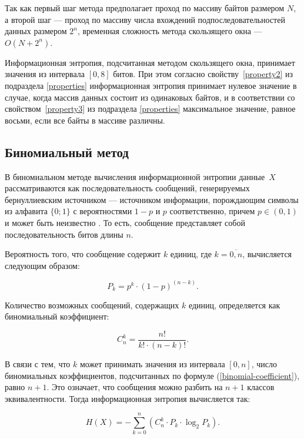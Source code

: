 Так как первый шаг метода предполагает проход по массиву байтов размером $N$, а второй шаг --- проход по массиву числа вхождений подпоследовательностей данных размером $2^n$, временная сложность метода скользящего окна --- $O(N + 2^n)$. 

Информационная энтропия, подсчитанная методом скользящего окна, принимает значения из интервала $[0, 8]$ битов. При этом согласно свойству~\ref{property2} из подраздела \ref{properties} информационная энтропия принимает нулевое значение в случае, когда массив данных состоит из одинаковых байтов, и в соответствии со свойством~\ref{property3} из подраздела \ref{properties} максимальное значение, равное восьми, если все байты в массиве различны.

\subsection{Биномиальный метод}\label{binomial}

В биномиальном методе вычисления информационной энтропии \cite{binomial-method} данные~$X$ рассматриваются как последовательность сообщений, генерируемых бернуллиевским источником --- источником информации, порождающим символы из алфавита $\{0; 1\}$ с вероятностями $1 - p$ и $p$ соответственно, причем $p \in (0, 1)$ и может быть неизвестно \cite{bernullie-source}. То есть, сообщение представляет собой последовательность битов длины $n$.

Вероятность того, что сообщение содержит $k$ единиц, где $k = \overline{0, n}$, вычисляется следующим образом:

\begin{equation}\label{pk}
	P_{k} = p^k \cdot (1 - p)^{(n - k)}.
\end{equation} 

Количество возможных сообщений, содержащих $k$ единиц, определяется как биномиальный коэффициент:

\begin{equation}\label{binomial-coefficient}
	C_{n}^k = \frac{n!}{k! \cdot (n - k)!}.
\end{equation}

В связи с тем, что $k$ может принимать значения из интервала $[0, n]$, число биномиальных коэффициентов, подсчитанных по формуле (\ref{binomial-coefficient}), равно $n + 1$. Это означает, что сообщения можно разбить на $n + 1$ классов эквивалентности. Тогда информационная энтропия вычисляется так:

\begin{equation}\label{binomial-entropy}
	H(X) = -\sum_{k = 0}^n (C_{n}^k \cdot P_{k} \cdot \log_{2}P_{k}).
\end{equation}

